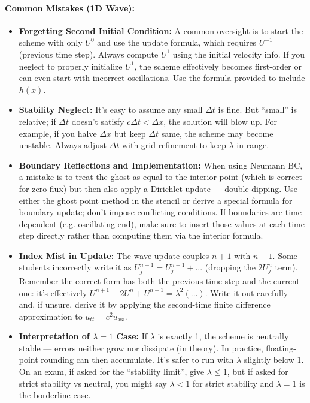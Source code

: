 \documentclass[a4paper,11pt]{report}
\begin{document}
\paragraph{Common Mistakes (1D Wave):}
\begin{itemize}
    \item \textbf{Forgetting Second Initial Condition:} A common oversight is to start the scheme with only $U^0$ and use the update formula, which requires $U^{-1}$ (previous time step). Always compute $U^1$ using the initial velocity info. If you neglect to properly initialize $U^1$, the scheme effectively becomes first-order or can even start with incorrect oscillations. Use the formula provided to include $h(x)$.
    \item \textbf{Stability Neglect:} It’s easy to assume any small $\Delta t$ is fine. But “small” is relative; if $\Delta t$ doesn’t satisfy $c\Delta t < \Delta x$, the solution will blow up. For example, if you halve $\Delta x$ but keep $\Delta t$ same, the scheme may become unstable. Always adjust $\Delta t$ with grid refinement to keep $\lambda$ in range.
    \item \textbf{Boundary Reflections and Implementation:} When using Neumann BC, a mistake is to treat the ghost as equal to the interior point (which is correct for zero flux) but then also apply a Dirichlet update — double-dipping. Use either the ghost point method in the stencil or derive a special formula for boundary update; don’t impose conflicting conditions. If boundaries are time-dependent (e.g. oscillating end), make sure to insert those values at each time step directly rather than computing them via the interior formula.
    \item \textbf{Index Mist in Update:} The wave update couples $n+1$ with $n-1$. Some students incorrectly write it as $U_j^{n+1} = U_j^{n-1} + ...$ (dropping the $2U_j^n$ term). Remember the correct form has both the previous time step and the current one: it’s effectively $U^{n+1} - 2U^n + U^{n-1} = \lambda^2(...)$. Write it out carefully and, if unsure, derive it by applying the second-time finite difference approximation to $u_{tt}=c^2u_{xx}$.
    \item \textbf{Interpretation of $\lambda=1$ Case:} If $\lambda$ is exactly 1, the scheme is neutrally stable — errors neither grow nor dissipate (in theory). In practice, floating-point rounding can then accumulate. It’s safer to run with $\lambda$ slightly below 1. On an exam, if asked for the “stability limit”, give $\lambda \le 1$, but if asked for strict stability vs neutral, you might say $\lambda<1$ for strict stability and $\lambda=1$ is the borderline case.
\end{itemize}
\end{document}
